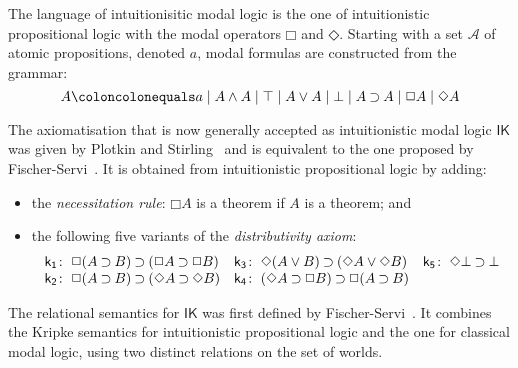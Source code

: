 \documentclass[twoside]{aiml18}
\newcommand*{\ax}[1]{\mathsf{#1}}
\newcommand*{\kax}[1][]		{\ax{k_{#1}}}
\newcommand*{\IK}{\mathsf{IK}}
\newcommand*{\NOT}{\neg}
\newcommand*{\AND}{\mathbin{\wedge}}
\newcommand*{\TOP}{\mathord{\top}}
\newcommand*{\OR}{\mathbin{\vee}}
\newcommand*{\BOT}{\mathord{\bot}}
\newcommand*{\IMP}{\mathbin{\supset}}
\newcommand*{\BOX}{\mathord{\Box}}
\newcommand*{\DIA}{\mathord{\Diamond}}
\begin{document}
	
	The language of {intuitionisitic modal logic} is the one of intuitionistic propositional logic with the modal operators $\BOX$ and $\DIA$. %
	Starting with a set $\mathcal{A}$ of atomic propositions, denoted $a$, modal formulas are constructed from the grammar:
	$$
	A \coloncolonequals
	a \mid A \AND A \mid \TOP \mid A \OR A \mid \BOT \mid A \IMP A \mid \BOX A \mid \DIA A
	$$

%

The axiomatisation that is now generally accepted as intuitionistic modal logic $\IK$ was given by Plotkin and Stirling~\cite{Plotkin} and is equivalent to the one proposed by Fischer-Servi~\cite{Fischer}.
%
It is obtained from intuitionistic propositional logic by adding:
\begin{itemize}
\item the \emph{necessitation rule}: $\BOX A$ is a theorem if $A$ is a theorem; and
\item the following five variants of the \emph{distributivity axiom}:
\begin{equation*}
\label{eq:ik}%
\begin{array}[t]{r@{\;}l@{\quad}r@{\;}l@{\quad}r@{\;}l}
\kax[1]\colon&\BOX(A\IMP B)\IMP(\BOX A\IMP\BOX B)
&
\kax[3]\colon&\DIA(A\OR B)\IMP(\DIA A\OR\DIA B)
&
\kax[5]\colon&\DIA\BOT\IMP\BOT
\\
\kax[2]\colon&\BOX(A\IMP B)\IMP(\DIA A\IMP\DIA B)
&
\kax[4]\colon&(\DIA A\IMP \BOX B)\IMP\BOX(A\IMP B)\\%
\end{array}
\end{equation*}
\end{itemize}

The relational semantics for $\IK$ was first defined by Fischer-Servi~\cite{Fischer}.
%
It combines the Kripke semantics for intuitionistic propositional logic and the one for classical modal logic, using two distinct relations on the set of worlds.
\end{document}
